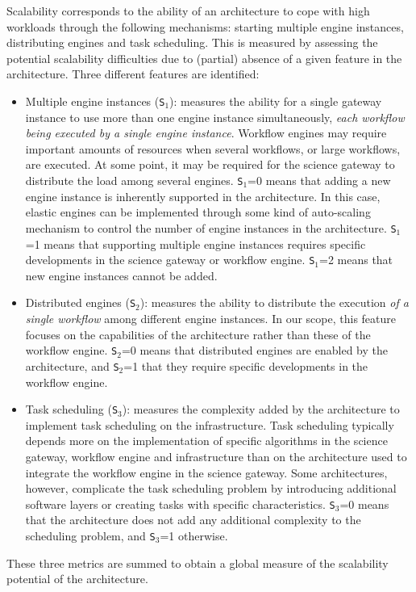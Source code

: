 \documentclass[preprint,3p,twocolumn]{elsarticle}
\newcommand{\correction}[1]{\color{blue}#1\color{black}\xspace}
\begin{document}
Scalability corresponds to the ability of an architecture to
cope with high workloads through the following mechanisms: starting multiple engine instances, distributing engines and task scheduling. 
This is measured by assessing the potential
scalability difficulties due to (partial) absence of a given feature in the architecture.  
 Three different features are identified:
\begin{itemize}[leftmargin=0cm,itemindent=0.35cm,itemsep=0cm]
\item Multiple engine instances (\texttt{S$_1$}): measures the
  \correction{ability} for a single gateway instance to use more than
  one engine instance simultaneously, \correction{\emph{each workflow
      being executed by a single engine instance}}.  Workflow engines
  may require important amounts of resources when several workflows,
  or large workflows, are executed. At some point, it may be required
  for the science gateway to distribute the load among several
  engines. \texttt{S$_1$}=0 means that adding a new engine instance is
  inherently supported in the architecture. In this case, elastic
  engines can be implemented through some kind of auto-scaling
  mechanism to control the number of engine instances in the
  architecture. \texttt{S$_1$}=1 means that supporting multiple engine
  instances requires specific developments in the science gateway or
  workflow engine. \texttt{S$_1$}=2 means that new engine instances
  cannot be added.
\item Distributed engines (\texttt{S$_2$}): measures the \correction{ability to distribute}
  the execution \emph{of a single workflow} among different engine
  instances. In our scope, this feature focuses on the capabilities of
  the architecture rather than these of the workflow
  engine. \texttt{S$_2$}=0 means that distributed engines are enabled by
  the architecture, and \texttt{S$_2$}=1 that they require specific
  developments in the workflow engine. 
\item Task scheduling (\texttt{S$_3$}): measures the complexity
  added by the architecture to implement task scheduling on
  the infrastructure. Task
  scheduling typically depends more on the implementation of specific
  algorithms in the science gateway, workflow engine and
  infrastructure than on the architecture used to integrate the
  workflow engine in the science gateway. Some architectures, however,
  complicate the task scheduling problem by introducing additional
  software layers or creating tasks with specific
  characteristics. \texttt{S$_3$}=0 means that the architecture does
  not add any additional complexity to the scheduling problem,
  and \texttt{S$_3$}=1 otherwise.
\end{itemize}
These three metrics are summed to obtain a global measure of the scalability
potential of the architecture.
\end{document}
